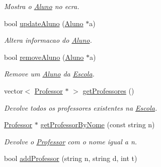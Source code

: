 \begin{DoxyCompactItemize}
\begin{DoxyCompactList}\small\item\em Mostra o \hyperlink{class_aluno}{Aluno} no ecra. \end{DoxyCompactList}\item 
\hypertarget{class_escola_ab8ae7317b753dbe8308a60ac39d4f714}{bool \hyperlink{class_escola_ab8ae7317b753dbe8308a60ac39d4f714}{update\-Aluno} (\hyperlink{class_aluno}{Aluno} $\ast$a)}\label{class_escola_ab8ae7317b753dbe8308a60ac39d4f714}

\begin{DoxyCompactList}\small\item\em Altera informacao do \hyperlink{class_aluno}{Aluno}. \end{DoxyCompactList}\item 
\hypertarget{class_escola_acfa55addf5866a486acdfdc84ee9c66a}{bool \hyperlink{class_escola_acfa55addf5866a486acdfdc84ee9c66a}{remove\-Aluno} (\hyperlink{class_aluno}{Aluno} $\ast$a)}\label{class_escola_acfa55addf5866a486acdfdc84ee9c66a}

\begin{DoxyCompactList}\small\item\em Remove um \hyperlink{class_aluno}{Aluno} da \hyperlink{class_escola}{Escola}. \end{DoxyCompactList}\item 
\hypertarget{class_escola_a8cdb86f03082f15f5f3ce63d1ae0b1f2}{vector$<$ \hyperlink{class_professor}{Professor} $\ast$ $>$ \hyperlink{class_escola_a8cdb86f03082f15f5f3ce63d1ae0b1f2}{get\-Professores} ()}\label{class_escola_a8cdb86f03082f15f5f3ce63d1ae0b1f2}

\begin{DoxyCompactList}\small\item\em Devolve todos os professores existentes na \hyperlink{class_escola}{Escola}. \end{DoxyCompactList}\item 
\hypertarget{class_escola_a1f0dba75b82a3aec3cdaccafec4350c3}{\hyperlink{class_professor}{Professor} $\ast$ \hyperlink{class_escola_a1f0dba75b82a3aec3cdaccafec4350c3}{get\-Professor\-By\-Nome} (const string n)}\label{class_escola_a1f0dba75b82a3aec3cdaccafec4350c3}

\begin{DoxyCompactList}\small\item\em Devolve o \hyperlink{class_professor}{Professor} com o nome igual a n. \end{DoxyCompactList}\item 
\hypertarget{class_escola_a9cb288aece2339850bd18eaf1614f8b9}{bool \hyperlink{class_escola_a9cb288aece2339850bd18eaf1614f8b9}{add\-Professor} (string n, string d, int t)}\label{class_escola_a9cb288aece2339850bd18eaf1614f8b9}


\end{DoxyCompactItemize}
